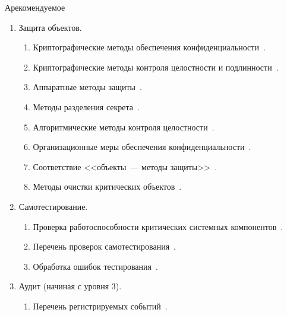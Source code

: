 \begin{appendix}{А}{рекомендуемое}
\begin{enumerate}
\begin{enumerate}
\item
Состояния СКЗИ и правила перехода между состояниями~.
\end{enumerate}

\item
{Защита объектов.}

\begin{enumerate}
\item
Криптографические методы обеспечения конфиденциальности~.

\item
Криптографические методы контроля целостности и 
подлинности~. 

\item
Аппаратные методы защиты~.

\item
Методы разделения секрета~.

\item
Алгоритмические методы контроля целостности~.

\item
Организационные меры обеспечения конфиденциальности~.

\item
Соответствие <<объекты~--- методы защиты>>~.

\item
Методы очистки критических объектов~.
\end{enumerate}

\item
{Самотестирование.}

\begin{enumerate}
\item
Проверка работоспособности критических системных компонентов~.

\item
Перечень проверок самотестирования~.

\item
Обработка ошибок тестирования~.
\end{enumerate}

\item
Аудит (начиная с уровня 3).

\begin{enumerate}
\item
Перечень регистрируемых событий~.


\end{enumerate}
\end{enumerate}
\end{appendix}
